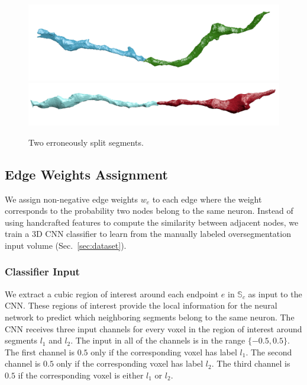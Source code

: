 \begin{figure}[t]
	\centering
	\includegraphics[width=0.92\linewidth]{./figures/split_error1.png}
	\includegraphics[width=0.92\linewidth]{./figures/split_error2.png}
	\caption{Two erroneously split segments.}
	\label{fig:merge_candidates}
\end{figure}

\subsection{Edge Weights Assignment}
We assign non-negative edge weights $w_e$ to each edge where the weight corresponds to the probability two nodes belong to the same neuron.
Instead of using handcrafted features to compute the similarity between adjacent nodes, we train a 3D CNN classifier to learn from the manually labeled oversegmentation input volume (Sec.~\ref{sec:dataset}).

\subsubsection{Classifier Input}

We extract a cubic region of interest around each endpoint $e$ in $\mathbb{S}_c$ as input to the CNN. These regions of interest provide the local information for the neural network to predict which neighboring segments belong to the same neuron. The CNN receives three input channels for every voxel in the region of interest around segments $l_1$ and $l_2$. The input in all of the channels is in the range $\{-0.5, 0.5\}$. The first channel is $0.5$ only if the corresponding voxel has label $l_1$. The second channel is $0.5$ only if the corresponding voxel has label $l_2$. The third channel is $0.5$ if the corresponding voxel is either $l_1$ or $l_2$.

